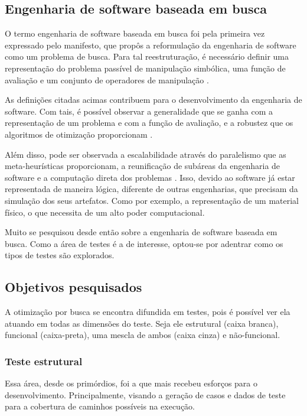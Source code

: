 \subsection{Engenharia de software baseada em busca}

O termo engenharia de software baseada em busca foi pela primeira vez expressado
pelo manifesto, que propôs a reformulação da engenharia de software como um
problema de busca. Para tal reestruturação, é necessário definir uma
representação do problema passível de manipulação simbólica, uma função de
avaliação e um conjunto de operadores de manipulação \cite{harman2001search}.

As definições citadas acimas contribuem para o desenvolvimento da engenharia de
software. Com tais, é possível observar a generalidade que se ganha com a
representação de um problema e com a função de avaliação, e a robustez que os
algoritmos de otimização proporcionam \cite{harman2012search}. 

Além disso, pode ser observada a escalabilidade através do paralelismo que as
meta-heurísticas proporcionam, a reunificação de subáreas da engenharia de
software e a computação direta dos problemas \cite{harman2012search}. Isso,
devido ao software já estar representada de maneira lógica, diferente de outras
engenharias, que precisam da simulação dos seus artefatos. Como por exemplo, a
representação de um material físico, o que necessita de um alto poder
computacional.

Muito se pesquisou desde então sobre a engenharia de software baseada em busca.
Como a área de testes é a de interesse, optou-se por adentrar como os tipos de
testes são explorados.

\subsection{Objetivos pesquisados}

A otimização por busca se encontra difundida em testes, pois é possível ver ela
atuando em todas as dimensões do teste. Seja ele estrutural (caixa branca),
funcional (caixa-preta), uma mescla de ambos (caixa cinza) e não-funcional.

\subsubsection{Teste estrutural}

Essa área, desde os primórdios, foi a que mais recebeu esforços para o
desenvolvimento. Principalmente, visando a geração de casos e dados de teste
para a cobertura de caminhos possíveis na execução. 

